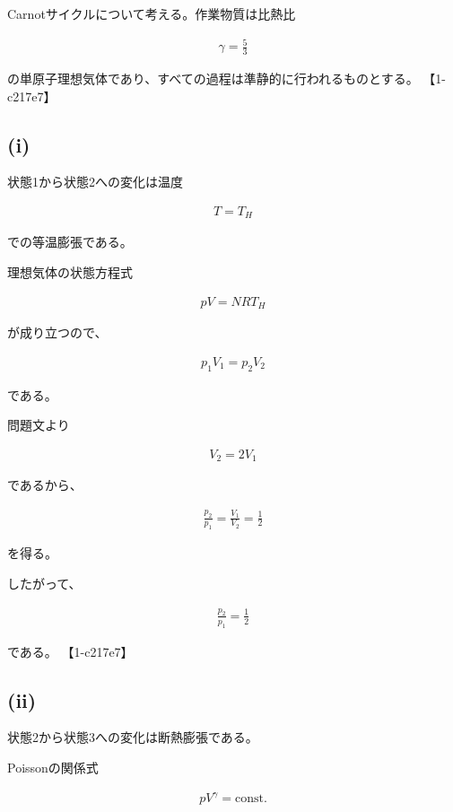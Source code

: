 \documentclass[platex,dvipdfmx,a4paper]{jsarticle}
\begin{document}
Carnotサイクルについて考える。作業物質は比熱比

\begin{align*}
\gamma=\frac53
\end{align*}

の単原子理想気体であり、すべての過程は準静的に行われるものとする。 【1-c217e7】

\subsection{(i)}

状態1から状態2への変化は温度

\begin{align*}
T=T_H
\end{align*}

での等温膨張である。

理想気体の状態方程式

\begin{align*}
pV=NRT_H
\end{align*}

が成り立つので、

\begin{align*}
p_1V_1
=
p_2V_2
\end{align*}

である。

問題文より

\begin{align*}
V_2=2V_1
\end{align*}

であるから、

\begin{align*}
\frac{p_2}{p_1}
=
\frac{V_1}{V_2}
=
\frac12
\end{align*}

を得る。

したがって、

\begin{align*}
\frac{p_2}{p_1}
=
\frac12
\end{align*}

である。 【1-c217e7】

\subsection{(ii)}

状態2から状態3への変化は断熱膨張である。

Poissonの関係式

\begin{align*}
pV^\gamma
=
\mathrm{const.}
\end{align*}
\end{document}
